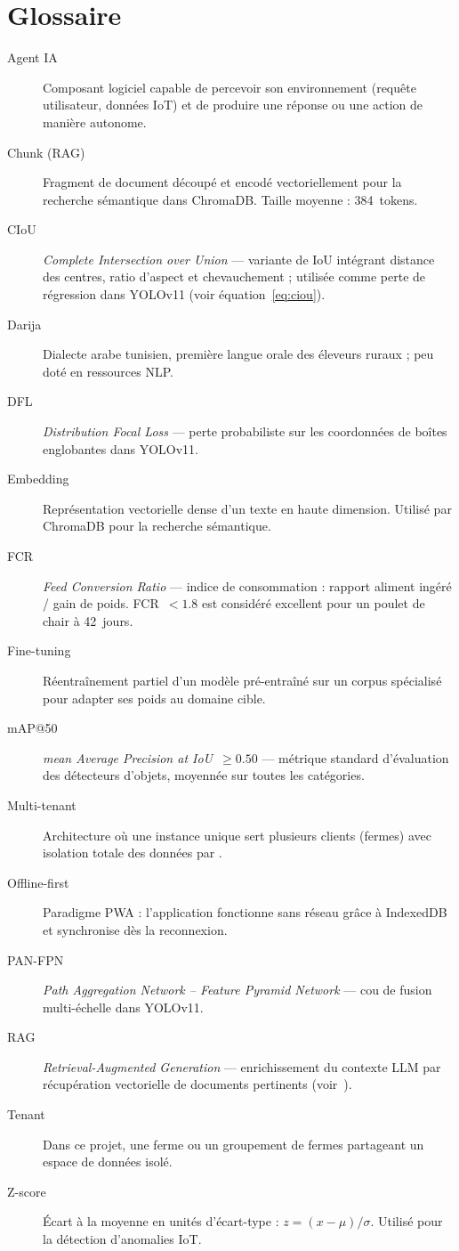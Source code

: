 
\chapter*{Glossaire}

\begin{description}
  \item[Agent IA] Composant logiciel capable de percevoir son environnement
    (requête utilisateur, données IoT) et de produire une réponse ou une
    action de manière autonome.
  \item[Chunk (RAG)] Fragment de document découpé et encodé vectoriellement
    pour la recherche sémantique dans ChromaDB. Taille moyenne : 384~tokens.
  \item[CIoU] \textit{Complete Intersection over Union} — variante de IoU
    intégrant distance des centres, ratio d'aspect et chevauchement ;
    utilisée comme perte de régression dans YOLOv11 (voir équation~\ref{eq:ciou}).
  \item[Darija] Dialecte arabe tunisien, première langue orale des éleveurs
    ruraux ; peu doté en ressources NLP.
  \item[DFL] \textit{Distribution Focal Loss} — perte probabiliste sur les
    coordonnées de boîtes englobantes dans YOLOv11.
  \item[Embedding] Représentation vectorielle dense d'un texte en haute
    dimension. Utilisé par ChromaDB pour la recherche sémantique.
  \item[FCR] \textit{Feed Conversion Ratio} — indice de consommation :
    rapport aliment ingéré / gain de poids. FCR~$< 1.8$ est considéré
    excellent pour un poulet de chair à 42~jours.
  \item[Fine-tuning] Réentraînement partiel d'un modèle pré-entraîné sur
    un corpus spécialisé pour adapter ses poids au domaine cible.
  \item[mAP@50] \textit{mean Average Precision at IoU~$\geq 0.50$} —
    métrique standard d'évaluation des détecteurs d'objets, moyennée sur
    toutes les catégories.
  \item[Multi-tenant] Architecture où une instance unique sert plusieurs
    clients (fermes) avec isolation totale des données par .
  \item[Offline-first] Paradigme PWA : l'application fonctionne sans
    réseau grâce à IndexedDB et synchronise dès la reconnexion.
  \item[PAN-FPN] \textit{Path Aggregation Network -- Feature Pyramid
    Network} — cou de fusion multi-échelle dans YOLOv11.
  \item[RAG] \textit{Retrieval-Augmented Generation} — enrichissement du
    contexte LLM par récupération vectorielle de documents pertinents
    (voir~\cite{lewis2020rag}).
  \item[Tenant] Dans ce projet, une ferme ou un groupement de fermes
    partageant un espace de données isolé.
  \item[Z-score] Écart à la moyenne en unités d'écart-type :
    $z = (x-\mu)/\sigma$. Utilisé pour la détection d'anomalies IoT.
\end{description}
